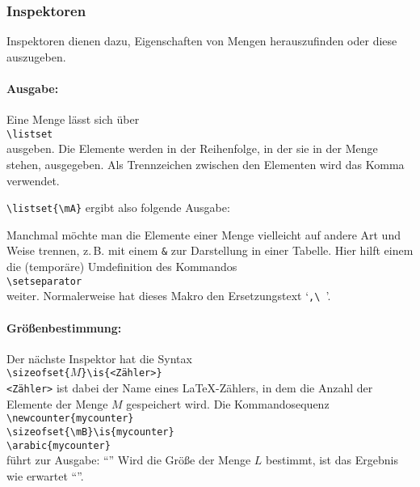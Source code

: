 \subsubsection{Inspektoren}\label{inspektoren}
Inspektoren dienen dazu, Eigenschaften von Mengen herauszufinden oder diese auszugeben.

\paragraph{Ausgabe:}Eine Menge lässt sich über\\
\mbox{}\hspace{2em}\verb$\listset$\\
ausgeben. Die Elemente werden in der Reihenfolge, in der sie in der Menge stehen, ausgegeben. Als Trennzeichen zwischen den Elementen wird das Komma verwendet.

\verb$\listset{\mA}$ ergibt also folgende Ausgabe:\\
\centerline{\listset{\mA}}

Manchmal möchte man die Elemente einer Menge vielleicht auf andere Art und Weise trennen, z.\,B. mit einem \texttt{\&} zur Darstellung in einer Tabelle. Hier hilft einem die (temporäre) Umdefinition des Kommandos\\
\mbox{}\hspace{2em}\verb$\setseparator$\\
weiter. Normalerweise hat dieses Makro den Ersetzungstext `\verb*$,\ $'.

\paragraph{Größenbestimmung:} Der nächste Inspektor hat die Syntax\\
\mbox{}\hspace{2em}\verb$\sizeofset{$$M$\verb$}\is{<Zähler>}$\\
\texttt{<Zähler>} ist dabei der Name eines \LaTeX-Zählers, in dem die Anzahl der Elemente der Menge $M$ gespeichert wird. Die Kommandosequenz\\
\mbox{}\hspace{2em}\verb$\newcounter{mycounter}$\\
\mbox{}\hspace{2em}\verb$\sizeofset{\mB}\is{mycounter}$\sizeofset{\mB}\\
\mbox{}\hspace{2em}\verb$\arabic{mycounter}$\\
führt zur Ausgabe: "`"'
Wird die Größe der Menge $L$ bestimmt, ist das Ergebnis \sizeofset{\mL}wie erwartet "`"'.

